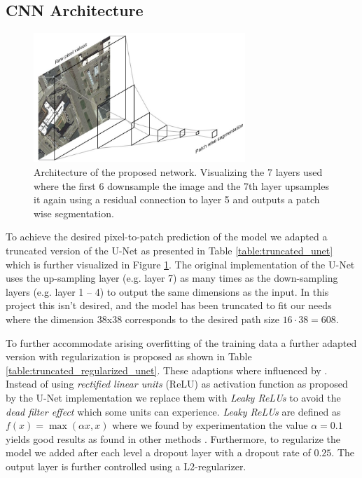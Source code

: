 \documentclass[10pt,conference,compsocconf]{IEEEtran}
\begin{document}
\subsection{CNN Architecture}

\begin{figure}
\includegraphics[width={8cm}]{network-visualisation}
\caption{Architecture of the proposed network. Visualizing the 7 layers used where the first 6 downsample the image and the 7th layer upsamples it again using a residual connection to layer 5 and outputs a patch wise segmentation.}
\label{fig:architecture}
\end{figure}

To achieve the desired pixel-to-patch prediction of the model we adapted a truncated version of the U-Net \cite{Ronneberger2015} as presented in Table \ref{table:truncated_unet} which is further visualized in Figure \ref{fig:architecture}. The original implementation of the U-Net uses the up-sampling layer (e.g. layer 7) as many times as the down-sampling layers (e.g. layer 1 – 4) to output the same dimensions as the input. In this project this isn't desired, and the model has been truncated to fit our needs where the dimension 38x38 corresponds to the desired path size $16 \cdot 38 = 608$.

To further accommodate arising overfitting of the training data a further adapted version with regularization is proposed as shown in Table \ref{table:truncated_regularized_unet}. These adaptions where influenced by \cite{Pavllo2017}. Instead of using \textit{rectified linear units} (ReLU) as activation function as proposed by the U-Net implementation \cite{Ronneberger2015} we replace them with \textit{Leaky ReLUs} to avoid the \textit{dead filter effect} which some units can experience. \textit{Leaky ReLUs} are defined as $f(x) = \max(\alpha x, x)$ where we found by experimentation the value $\alpha=0.1$ yields good results as found in other methods \cite{Pavllo2017}. Furthermore, to regularize the model we added after each level a dropout layer with a dropout rate of $0.25$. The output layer is further controlled using a L2-regularizer.
\end{document}

